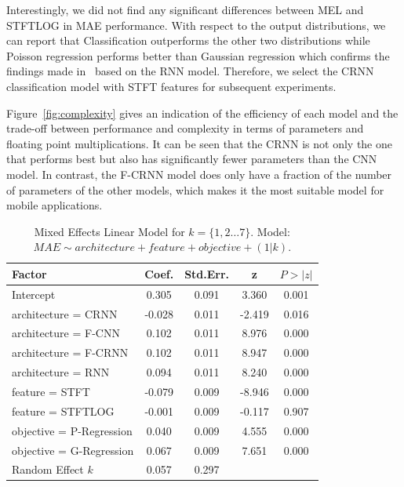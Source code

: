 Interestingly, we did not find any significant differences between MEL and STFTLOG in MAE performance.
With respect to the output distributions, we can report that Classification outperforms the other two distributions while Poisson regression performs better than Gaussian regression which confirms the findings made in~\cite{stoeter17} based on the RNN model.
Therefore, we select the CRNN classification model with STFT features for subsequent experiments.
\par
Figure~\ref{fig:complexity} gives an indication of the efficiency of each model and the trade-off between performance and complexity in terms of parameters and floating point multiplications.
It can be seen that the CRNN is not only the one that performs best but also has significantly fewer parameters than the CNN model.
In contrast, the F-CRNN model does only have a fraction of the number of parameters of the other models, which makes it the most suitable model for mobile applications.

\begin{table}[t]
\begin{center}
\scriptsize
\begin{tabular}{lcccc}
\toprule
Factor                    & Coef.  & Std.Err. &   z    & \(P>|z|\) \\
\midrule
Intercept                      &  0.305 &    0.091 &  3.360 &       0.001 \\
architecture = CRNN            & -0.028 &    0.011 & -2.419 &       0.016 \\
architecture = F-CNN           &  0.102 &    0.011 &  8.976 &       0.000 \\
architecture = F-CRNN          &  0.102 &    0.011 &  8.947 &       0.000 \\
architecture = RNN             &  0.094 &    0.011 &  8.240 &       0.000 \\
feature = STFT                 & -0.079 &    0.009 & -8.946 &       0.000 \\
feature = STFTLOG              & -0.001 &    0.009 & -0.117 &       0.907 \\
objective = P-Regression       &  0.040 &    0.009 &  4.555 &       0.000 \\
objective = G-Regression       &  0.067 &    0.009 &  7.651 &       0.000 \\
Random Effect \(k\)            &  0.057 &    0.297 &        &             \\
\bottomrule
\end{tabular}
\end{center}%
\caption{Mixed Effects Linear Model for \(k = \{1, 2\dots7\}\). Model: \(MAE \sim architecture + feature + objective + (1|k)\).}
\label{tab:mixedmodel1}
\end{table}

